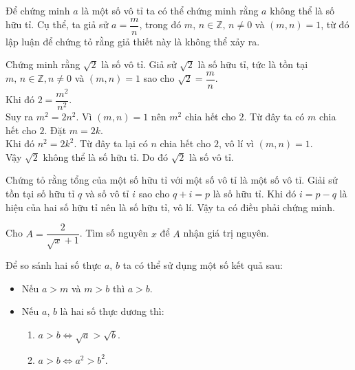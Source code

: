\begin{dang}[Số vô tỉ]
Để chứng minh $a$ là một số vô tỉ ta có thể chứng minh rằng $a$ không thể là số hữu tỉ. Cụ thể, ta giả sử $a = \dfrac{m}{n}$, trong đó $m, \, n \in \mathbb{Z},\, n \ne 0$ và $(m,n)=1$, từ đó lập luận để chứng tỏ rằng giả thiết này là không thể xảy ra.
\end{dang}
\begin{vd}
Chứng minh rằng $\sqrt{2}$ là số vô tỉ.
\loigiai
{
Giả sử $\sqrt{2}$ là số hữu tỉ, tức là tồn tại $m, \, n \in \mathbb{Z}, n\ne 0$ và $(m,n)=1$ sao cho $\sqrt 2 = \dfrac{m}{n}$.\\
Khi đó $2 = \dfrac{m^2}{n^2}$.\\
Suy ra $m^2 = 2n^2$. Vì $(m,n)=1$ nên $m^2$ chia hết cho $2$. Từ đây ta có $m$ chia hết cho $2$. Đặt $m = 2k$.\\
Khi đó $n^2 = 2k^2$. Từ đây ta lại có $n$ chia hết cho $2$, vô lí vì $(m,n)=1$.\\
Vậy $\sqrt 2$ không thể là số hữu tỉ. Do đó $\sqrt 2$ là số vô tỉ.
}
\end{vd}
\begin{vd}
Chứng tỏ rằng tổng của một số hữu tỉ với một số vô tỉ là một số vô tỉ.
\loigiai
{
Giải sử tồn tại số hữu tỉ $q$ và số vô tỉ $i$ sao cho $q+i = p$ là số hữu tỉ. Khi đó $i = p-q$ là hiệu của hai số hữu tỉ nên là số hữu tỉ, vô lí. Vậy ta có điều phải chứng minh.
}
\end{vd}
\begin{vd}
	Cho $A = \dfrac{2}{\sqrt{x} + 1}$. Tìm số nguyên $x$ để $A$ nhận giá trị nguyên.
\end{vd}
\begin{dang}
	Để so sánh hai số thực $a$, $b$ ta có thể sử dụng một số kết quả sau:
	\begin{itemize}
		\item Nếu $a>m$ và $m>b$ thì $a>b$.
		\item Nếu $a$, $b$ là hai số thực dương thì:
		\begin{enumerate}[+]
			\item $a > b \Leftrightarrow \sqrt{a} > \sqrt{b} $.
			\item $a > b\Leftrightarrow a^2 > b^2$.
		\end{enumerate}
	\end{itemize}
\end{dang}
